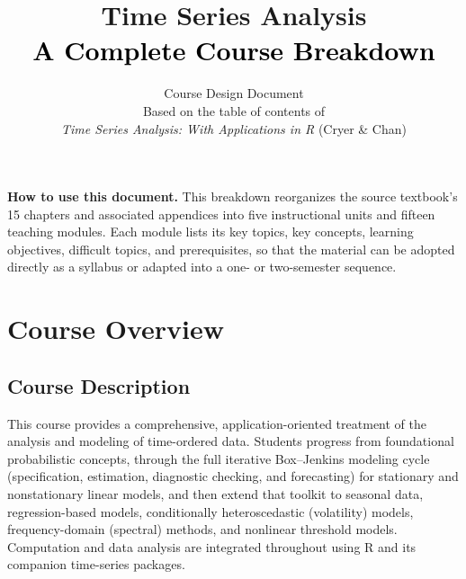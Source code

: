 \documentclass[11pt]{article}
\title{\color{unitblue}\textbf{Time Series Analysis}\\[4pt]\Large\textcolor{black}{A Complete Course Breakdown}}
\author{Course Design Document\\[2pt]\normalsize Based on the table of contents of\\ \emph{Time Series Analysis: With Applications in R} (Cryer \& Chan)}
\date{}
\begin{document}
\maketitle
\thispagestyle{empty}

\begin{center}
\begin{tcolorbox}[enhanced, width=0.9\textwidth, colback=panelgray, colframe=unitblue!60, arc=2pt, boxrule=0.6pt]
\small
\textbf{How to use this document.} This breakdown reorganizes the source textbook's 15 chapters and associated appendices into five instructional units and fifteen teaching modules. Each module lists its key topics, key concepts, learning objectives, difficult topics, and prerequisites, so that the material can be adopted directly as a syllabus or adapted into a one- or two-semester sequence.
\end{tcolorbox}
\end{center}

\newpage
\tableofcontents
\newpage

\section{Course Overview}

\subsection{Course Description}
This course provides a comprehensive, application-oriented treatment of the analysis and modeling of time-ordered data. Students progress from foundational probabilistic concepts, through the full iterative Box--Jenkins modeling cycle (specification, estimation, diagnostic checking, and forecasting) for stationary and nonstationary linear models, and then extend that toolkit to seasonal data, regression-based models, conditionally heteroscedastic (volatility) models, frequency-domain (spectral) methods, and nonlinear threshold models. Computation and data analysis are integrated throughout using R and its companion time-series packages.
\end{document}
